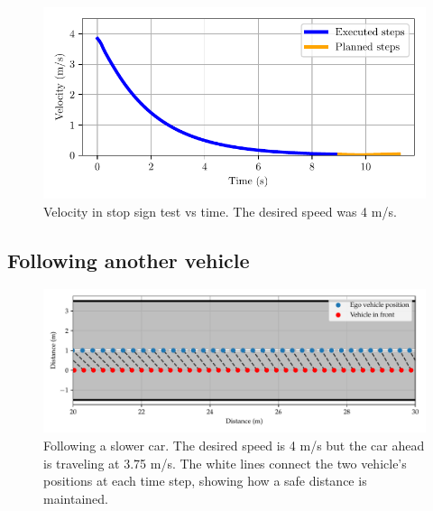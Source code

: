 \documentclass[letterpaper, 10 pt, conference]{ieeeconf}  %
\begin{document}
 \begin{figure}[h!]
 	\centering
 	 \vspace{-0.5em}
 	\includegraphics[width=0.9\linewidth]{figures/stop_sign_velocity.pdf}
 	\vspace{-1em}
 	\caption{Velocity in stop sign test vs time. The desired speed was 4 m/s.} 	 
\vspace{-1em}
 	 \label{fig:stop_sign_velocity}
 \end{figure}
  \subsection{Following another vehicle}
 \vspace{-0.5em}
 
 \begin{figure}[h!]
 	\centering
 	\includegraphics[width=1.0\linewidth]{figures/vehicle_following.pdf}
 	 	\vspace{-1.5em}
 	\caption{Following a slower car. The desired speed is 4 m/s but the car ahead is traveling at 3.75 m/s. The white lines connect the two vehicle's positions at each time step, showing how a safe distance is maintained.}
        \label{fig:vehicle_following}
 \end{figure}
 
\end{document}
